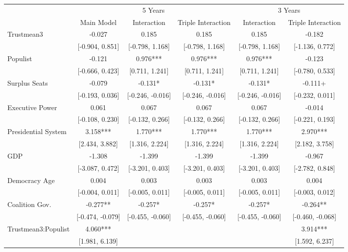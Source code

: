 \begin{table}
\centering\centering
\fontsize{9}{11}\selectfont
\begin{tabular}[t]{lccccc}
\toprule
\multicolumn{1}{c}{ } & \multicolumn{3}{c}{5 Years} & \multicolumn{2}{c}{3 Years} \\
\cmidrule(l{3pt}r{3pt}){2-4} \cmidrule(l{3pt}r{3pt}){5-6}
  & Main Model & Interaction & Triple Interaction & Interaction  & Triple Interaction \\
\midrule
Trustmean3 & -0.027 & 0.185 & 0.185 & 0.185 & -0.182\\
 & {}[-0.904, 0.851] & {}[-0.798, 1.168] & {}[-0.798, 1.168] & {}[-0.798, 1.168] & {}[-1.136, 0.772]\\
Populist & -0.121 & 0.976*** & 0.976*** & 0.976*** & -0.123\\
 & {}[-0.666, 0.423] & {}[0.711, 1.241] & {}[0.711, 1.241] & {}[0.711, 1.241] & {}[-0.780, 0.533]\\
Surplus Seats & -0.079 & -0.131* & -0.131* & -0.131* & -0.111+\\
 & {}[-0.193, 0.036] & {}[-0.246, -0.016] & {}[-0.246, -0.016] & {}[-0.246, -0.016] & {}[-0.232, 0.011]\\
Executive Power & 0.061 & 0.067 & 0.067 & 0.067 & -0.014\\
 & {}[-0.108, 0.230] & {}[-0.132, 0.266] & {}[-0.132, 0.266] & {}[-0.132, 0.266] & {}[-0.221, 0.193]\\
Presidential System & 3.158*** & 1.770*** & 1.770*** & 1.770*** & 2.970***\\
 & {}[2.434, 3.882] & {}[1.316, 2.224] & {}[1.316, 2.224] & {}[1.316, 2.224] & {}[2.182, 3.758]\\
GDP & -1.308 & -1.399 & -1.399 & -1.399 & -0.967\\
 & {}[-3.087, 0.472] & {}[-3.201, 0.403] & {}[-3.201, 0.403] & {}[-3.201, 0.403] & {}[-2.782, 0.848]\\
Democracy Age & 0.004 & 0.003 & 0.003 & 0.003 & 0.004\\
 & {}[-0.004, 0.011] & {}[-0.005, 0.011] & {}[-0.005, 0.011] & {}[-0.005, 0.011] & {}[-0.003, 0.012]\\
Coalition Gov. & -0.277** & -0.257* & -0.257* & -0.257* & -0.264**\\
 & {}[-0.474, -0.079] & {}[-0.455, -0.060] & {}[-0.455, -0.060] & {}[-0.455, -0.060] & {}[-0.460, -0.068]\\
Trustmean3:Populist & 4.060*** &  &  &  & 3.914***\\
 & {}[1.981, 6.139] &  &  &  & {}[1.592, 6.237]\\

\end{tabular}
\end{table}
